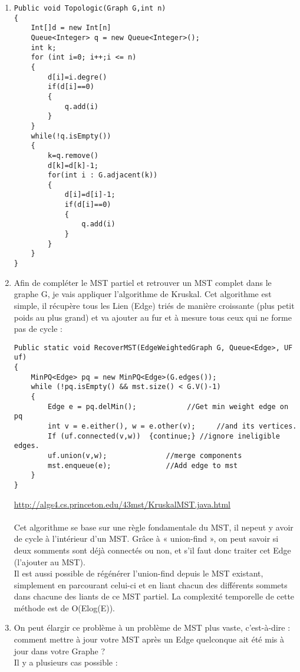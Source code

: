 \documentclass[11pt]{article}
\begin{document}
\begin{enumerate}
\item 
\begin{lstlisting}
Public void Topologic(Graph G,int n)
{
	Int[]d = new Int[n]
	Queue<Integer> q = new Queue<Integer>();
	int k;
	for (int i=0; i++;i <= n)
	{
		d[i]=i.degre()
		if(d[i]==0)
		{
			q.add(i)
		}
	}
	while(!q.isEmpty())
	{
		k=q.remove()
		d[k]=d[k]-1;
		for(int i : G.adjacent(k))
		{
			d[i]=d[i]-1;
			if(d[i]==0)
			{
				q.add(i)
			}
		}
	}
}

\end{lstlisting} 

\item Afin de compléter le MST partiel et retrouver un MST complet dans le graphe G, je vais appliquer l’algorithme de Kruskal. Cet algorithme est simple, il récupère tous les Lien (Edge) triés de manière croissante (plus petit poids au plus grand) et va ajouter au fur et à mesure tous ceux qui ne forme pas de cycle :
\\
\begin{lstlisting}
Public static void RecoverMST(EdgeWeightedGraph G, Queue<Edge>, UF uf)
{
	MinPQ<Edge> pq = new MinPQ<Edge>(G.edges());
	while (!pq.isEmpty() && mst.size() < G.V()-1)
	{
		Edge e = pq.delMin();   		 //Get min weight edge on pq
		int v = e.either(), w = e.other(v); 	//and its vertices.
		If (uf.connected(v,w))  {continue;}	//ignore ineligible edges.
		uf.union(v,w); 				//merge components 
		mst.enqueue(e);				//Add edge to mst
	}
}
\end{lstlisting} 

\url{http://algs4.cs.princeton.edu/43mst/KruskalMST.java.html}
\\
\\
Cet algorithme se base sur une règle fondamentale du MST, il nepeut y avoir de cycle à l’intérieur d’un MST. Grâce à « union-find », on peut savoir si deux somments sont déjà connectés ou non, et s’il faut donc traiter cet Edge (l’ajouter au MST).
\\
Il est aussi possible de régénérer l’union-find depuis le MST existant, simplement en parcourant celui-ci et en liant chacun des différents sommets dans chacune des liants de ce MST partiel.
La complexité temporelle de cette méthode est de O(Elog(E)).\\

\item On peut élargir ce problème à un problème de MST plus vaste, c’est-à-dire : comment mettre à jour votre MST après un Edge quelconque  ait été mis à jour dans votre Graphe ? \\
Il y a plusieurs cas possible : \\


\end{enumerate}
\end{document}
